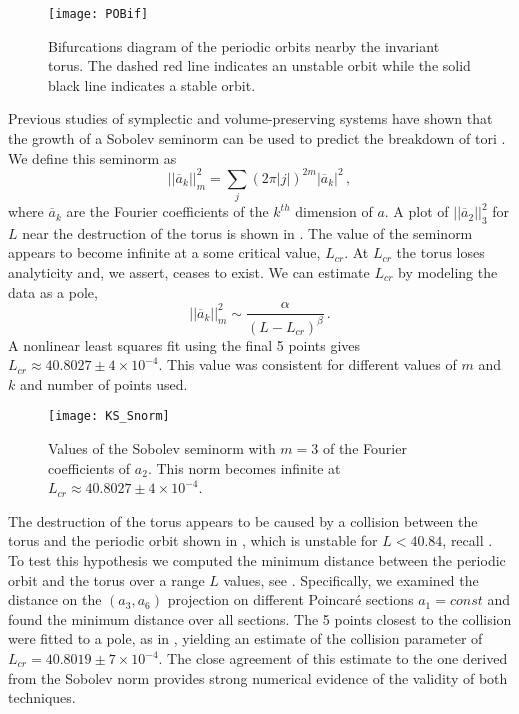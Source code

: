 \documentclass[aip,cha,reprint,
secnumarabic,
nofootinbib, tightenlines,
nobibnotes, showkeys, showpacs,
groupedaddress
]{revtex4-1}
\begin{document}
 \begin{figure}[!h]
\centering
\texttt{[image: POBif]}
  \caption{
 Bifurcations diagram of the periodic orbits nearby the invariant torus.  The dashed red line indicates an unstable orbit while the solid black line indicates a stable orbit.
   }
  \label{fig:POBif}
 \end{figure}

 Previous studies of symplectic and volume-preserving systems have shown that the growth of a Sobolev seminorm can be used to predict the breakdown of tori .  We define this seminorm as
\begin{equation}
 ||\overline{a}_k||_m^2 =  \sum_{j}(2\pi|j|)^{2m}|\overline{a}_k|^2
\,,
\label{Snorm}
\end{equation}
where $\overline{a}_k$ are the Fourier coefficients of the $k^{th}$ dimension of $a$.  A plot of $||\overline{a}_2||_3^2$ for $L$ near the destruction of the torus is shown in .   The value of the seminorm appears to become infinite at a some critical value, $L_{cr}$.  At $L_{cr}$ the torus loses analyticity and, we assert, ceases to exist.  We can estimate $L_{cr}$ by modeling the data as a pole,
\begin{equation}
||\overline{a}_k||_m^2  \sim \frac{\alpha}{(L-L_{cr})^{\beta}} \, .
\label{eq:pole}
\end{equation}
A nonlinear least squares fit using the final 5 points gives $L_{cr} \approx 40.8027 \pm 4 \times 10^{-4}$.  This value was consistent for different values of $m$ and $k$ and number of points used.

 \begin{figure}[!h]
\centering
\texttt{[image: KS\_Snorm]}
  \caption{
Values of the Sobolev seminorm  with $m=3$ of the Fourier coefficients of $a_2$.  This norm becomes infinite at $L_{cr} \approx 40.8027 \pm 4 \times 10^{-4}$.
   }
  \label{fig:Snorm}
 \end{figure}

The destruction of the torus appears to be
caused by a collision between the torus and the periodic orbit shown in , which is unstable for $L<40.84$, recall . To test this hypothesis we computed the minimum distance between the periodic orbit and the torus over a range $L$ values, see .  Specifically, we examined the distance on the $(a_3,a_6)$ projection on different Poincar\'e sections $a_1=const$ and found the minimum distance over all sections.  The 5 points closest to the collision were fitted to a pole, as in , yielding an estimate of the collision parameter of
$
L_{cr}=40.8019 \pm 7 \times 10^{-4}
$.  The close agreement of this estimate to the one derived from the Sobolev norm provides strong numerical evidence of the validity of both techniques.
\end{document}
